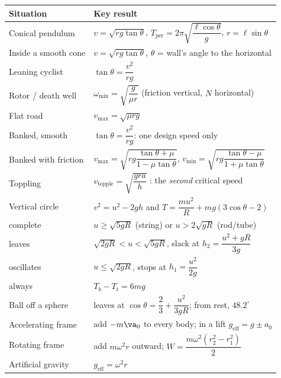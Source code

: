 \medskip
{\small\renewcommand{\arraystretch}{1.45}
\begin{center}
\begin{tabular}{@{}ll@{}}
\toprule
Situation & Key result\\
\midrule
Conical pendulum      & $v=\sqrt{rg\tan\theta}$, \; $T_{\text{per}}=2\pi\sqrt{\dfrac{\ell\cos\theta}{g}}$, \; $r=\ell\sin\theta$\\[3pt]
Inside a smooth cone  & $v=\sqrt{rg\tan\theta}$, $\theta$ = wall's angle to the horizontal\\[3pt]
Leaning cyclist       & $\tan\theta=\dfrac{v^{2}}{rg}$\\[3pt]
Rotor / death well    & $\omega_{\min}=\sqrt{\dfrac{g}{\mu r}}$ \; (friction vertical, $N$ horizontal)\\[3pt]
Flat road             & $v_{\max}=\sqrt{\mu rg}$\\[3pt]
Banked, smooth        & $\tan\theta=\dfrac{v^{2}}{rg}$: one design speed only\\[3pt]
Banked with friction  & $v_{\max}=\sqrt{rg\dfrac{\tan\theta+\mu}{1-\mu\tan\theta}}$, \;
                        $v_{\min}=\sqrt{rg\dfrac{\tan\theta-\mu}{1+\mu\tan\theta}}$\\[5pt]
Toppling              & $v_{\text{topple}}=\sqrt{\dfrac{gra}{h}}$ \;: the \emph{second} critical speed\\[4pt]
Vertical circle       & $v^{2}=u^{2}-2gh$ \;and\; $T=\dfrac{mu^{2}}{R}+mg(3\cos\theta-2)$\\[4pt]
\quad complete        & $u\ge\sqrt{5gR}$ \; (string) \quad or \quad $u>2\sqrt{gR}$ \; (rod/tube)\\[2pt]
\quad leaves          & $\sqrt{2gR}<u<\sqrt{5gR}$, slack at $h_2=\dfrac{u^{2}+gR}{3g}$\\[3pt]
\quad oscillates      & $u\le\sqrt{2gR}$, stops at $h_1=\dfrac{u^{2}}{2g}$\\[3pt]
\quad always          & $T_b-T_t=6mg$\\[3pt]
Ball off a sphere     & leaves at $\cos\theta=\dfrac23+\dfrac{u^{2}}{3gR}$; from rest, $48.2^\circ$\\[3pt]
Accelerating frame    & add $-m\va_0$ to every body; in a lift $g_{\text{eff}}=g\pm a_0$\\[3pt]
Rotating frame        & add $m\omega^{2}r$ outward; $W=\dfrac{m\omega^{2}(r_2^{2}-r_1^{2})}{2}$\\[3pt]
Artificial gravity    & $g_{\text{eff}}=\omega^{2}r$\\
\bottomrule
\end{tabular}
\end{center}
}

